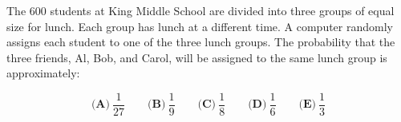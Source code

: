 

The $ 600$ students at King Middle School are divided into three groups of equal size for lunch. Each group has lunch at a different time. A computer randomly assigns each student to one of the three lunch groups. The probability that the three friends, Al, Bob, and Carol, will be assigned to the same lunch group is approximately:

\[ \textbf{(A)}\ \frac{1}{27} \qquad
\textbf{(B)}\ \frac{1}{9} \qquad
\textbf{(C)}\ \frac{1}{8} \qquad
\textbf{(D)}\ \frac{1}{6} \qquad
\textbf{(E)}\ \frac{1}{3}
\]

